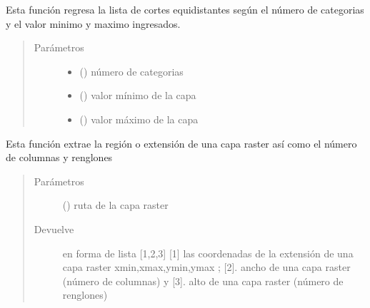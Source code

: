 \documentclass[letterpaper,10pt,spanish]{sphinxmanual}
\begin{document}
\begin{fulllineitems}
\label{\detokenize{apcsig:apcsig.equidistantes}}
Esta función regresa la lista de cortes equidistantes según el número 
de categorias y el valor minimo y maximo ingresados.
\begin{quote}\begin{description}
\item[{Parámetros}] \leavevmode\begin{itemize}
\item {} 
 () \textendash{} número de categorias

\item {} 
 () \textendash{} valor mínimo de la capa

\item {} 
 () \textendash{} valor máximo de la capa

\end{itemize}

\end{description}\end{quote}

\end{fulllineitems}


\begin{fulllineitems}
\label{\detokenize{apcsig:apcsig.get_region}}
Esta función extrae la región o extensión de una capa raster así como el número de columnas y renglones
\begin{quote}\begin{description}
\item[{Parámetros}] \leavevmode
{} () \textendash{} ruta de la capa raster

\item[{Devuelve}] \leavevmode
en forma de lista {[}1,2,3{]} {[}1{]} las coordenadas de la extensión de una capa raster xmin,xmax,ymin,ymax ; {[}2{]}. ancho de una capa raster (número de columnas) y {[}3{]}. alto de una capa raster (número de renglones)

\end{description}\end{quote}

\end{fulllineitems}
\end{document}
